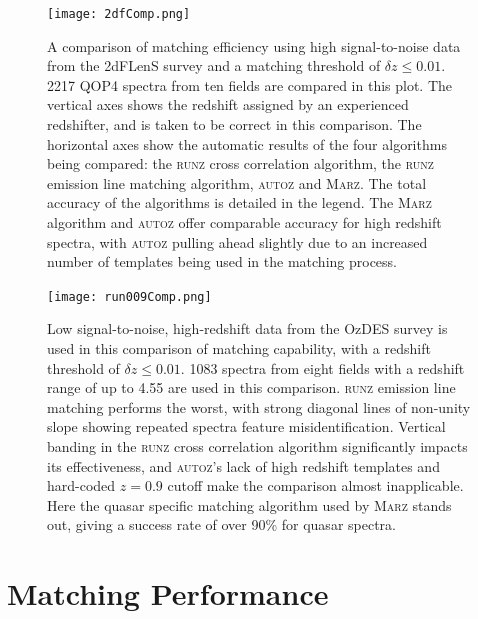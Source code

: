 \documentclass[iop]{emulateapj}
\newcommand{\runz}{\textsc{runz}}
\newcommand{\autoz}{\textsc{autoz}}
\newcommand{\marz}{\textsc{Marz}}
\begin{document}
\begin{figure}[h]
\centering
\texttt{[image: 2dfComp.png]}
\caption{A comparison of matching efficiency using high signal-to-noise data from the 2dFLenS survey and a matching threshold of $\delta z \leq 0.01$. 2217 QOP4 spectra from ten fields are compared in this plot. The vertical axes shows the redshift assigned by an experienced redshifter, and is taken to be correct in this comparison. The horizontal axes show the automatic results of the four algorithms being compared: the \runz{} cross correlation algorithm, the \runz{} emission line matching algorithm, \autoz{} and \marz{}. The total accuracy of the algorithms is detailed in the legend. The \marz{} algorithm and \autoz{} offer comparable accuracy for high redshift spectra, with \autoz{} pulling ahead slightly due to an increased number of templates being used in the matching process.}
\label{fig:high}
\end{figure}

\begin{figure}[h]
\centering
\texttt{[image: run009Comp.png]}
\caption{Low signal-to-noise, high-redshift data from the OzDES survey is used in this comparison of matching capability, with a redshift threshold of $\delta z \leq 0.01$. 1083 spectra from eight fields with a redshift range of up to 4.55 are used in this comparison. \runz{} emission line matching performs the worst, with strong diagonal lines of non-unity slope showing repeated spectra feature misidentification. Vertical banding in the \runz{} cross correlation algorithm significantly impacts its effectiveness, and \autoz{}'s lack of high redshift templates and hard-coded $z=0.9$ cutoff make the comparison almost inapplicable. Here the quasar specific matching algorithm used by \marz{} stands out, giving a success rate of over 90\% for quasar spectra.}
\label{fig:low}
\end{figure}





\section{Matching Performance}
\end{document}
